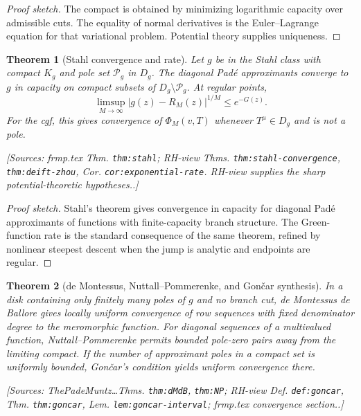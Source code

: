 \documentclass[11pt]{article}
\newtheorem{theorem}{Theorem}[section]
\theoremstyle{definition}
\newcommand{\Source}[1]{\par\smallskip\noindent\textup{[Sources: #1.]}}
\begin{document}
\begin{proof}[Proof sketch]
The compact is obtained by minimizing logarithmic capacity over admissible cuts.
The equality of normal derivatives is the Euler--Lagrange equation for that variational problem.
Potential theory supplies uniqueness.
\end{proof}

\begin{theorem}[Stahl convergence and rate]\label{thm:stahl-convergence}
Let $g$ be in the Stahl class with compact $K_g$ and pole set $\mathcal{P}_g$ in $D_g$.
The diagonal Padé approximants converge to $g$ in capacity on compact subsets of $D_g\setminus\mathcal{P}_g$.
At regular points,
\begin{equation}\label{eq:stahl-rate}
        \limsup_{M\to\infty}|g(z)-R_M(z)|^{1/M}\le e^{-G(z)}.
\end{equation}
For the cgf,
this gives convergence of $\Phi_M(v,T)$ whenever $T^{\mu}\in D_g$ and is not a pole.
\Source{frmp.tex Thm. \texttt{thm:stahl}; RH-view Thms. \texttt{thm:stahl-convergence}, \texttt{thm:deift-zhou}, Cor. \texttt{cor:exponential-rate}. RH-view supplies the sharp potential-theoretic hypotheses.}
\end{theorem}

\begin{proof}[Proof sketch]
Stahl's theorem gives convergence in capacity for diagonal Padé approximants of functions with finite-capacity branch structure.
The Green-function rate is the standard consequence of the same theorem,
refined by nonlinear steepest descent when the jump is analytic and endpoints are regular.
\end{proof}

\begin{theorem}[de Montessus, Nuttall--Pommerenke, and Gončar synthesis]\label{thm:local-global-synthesis}
In a disk containing only finitely many poles of $g$ and no branch cut,
de Montessus de Ballore gives locally uniform convergence of row sequences with fixed denominator degree to the meromorphic function.
For diagonal sequences of a multivalued function,
Nuttall--Pommerenke permits bounded pole-zero pairs away from the limiting compact.
If the number of approximant poles in a compact set is uniformly bounded,
Gončar's condition yields uniform convergence there.
\Source{ThePadeMuntz\ldots Thms. \texttt{thm:dMdB}, \texttt{thm:NP}; RH-view Def. \texttt{def:goncar}, Thm. \texttt{thm:goncar}, Lem. \texttt{lem:goncar-interval}; frmp.tex convergence section.}
\end{theorem}
\end{document}
